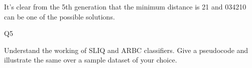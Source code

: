 \documentclass[12pt]{article}
\renewcommand{\_}{\kern-1.5pt\textunderscore\kern-1.5pt}
\begin{document}
\tab \tab \tab \par


\vspace{\baselineskip}
It’s clear from the 5th generation that the minimum distance is 21 and 034210 can be one of the possible solutions.\par


\vspace{\baselineskip}

\vspace{\baselineskip}

\vspace{\baselineskip}

\vspace{\baselineskip}

\vspace{\baselineskip}

\vspace{\baselineskip}

\vspace{\baselineskip}
\begin{Center}
{\fontsize{28pt}{33.6pt}\selectfont Q5\par}
\end{Center}\par

{\fontsize{14pt}{16.8pt}\selectfont Understand the working of SLIQ and ARBC classifiers. Give a pseudocode and illustrate the same over a sample dataset of your choice.\par}\par
\end{document}
